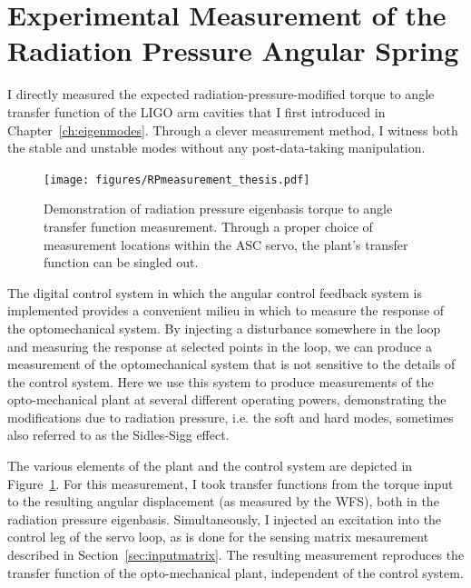 \section{Experimental Measurement of the Radiation Pressure Angular Spring}
\label{sec:siggsidles_measured}

I directly measured the expected radiation-pressure-modified torque to
angle transfer function of the LIGO arm cavities that I first
introduced in Chapter~\ref{ch:eigenmodes}. Through a clever
measurement method, I witness both the stable and unstable modes
without any post-data-taking manipulation.

\begin{figure}
\begin{centering}
\texttt{[image: figures/RPmeasurement\_thesis.pdf]}
\caption[Demonstration of radiation pressure eigenbasis torque to
angle transfer function measurement]{Demonstration of radiation
  pressure eigenbasis torque to angle transfer function
  measurement. Through a proper choice of measurement locations within
  the ASC servo, the plant's transfer function can be singled out.}
\label{fig:RPTFmeasurement}
\end{centering}
\end{figure}

The digital control system in which the angular control feedback
system is implemented provides a convenient milieu in which to measure
the response of the optomechanical system. By injecting a disturbance
somewhere in the loop and measuring the response at selected points in
the loop, we can produce a measurement of the optomechanical system
that is not sensitive to the details of the control system. Here we
use this system to produce measurements of the opto-mechanical plant at
several different operating powers, demonstrating the modifications due
to radiation pressure, i.e. the soft and hard modes, sometimes also
referred to as the Sidles-Sigg effect.

The various elements of the plant and the control system are depicted
in Figure~\ref{fig:RPTFmeasurement}.  For this measurement, I took
transfer functions from the torque input to the resulting angular
displacement (as measured by the WFS), both in the radiation pressure
eigenbasis. Simultaneously, I injected an excitation into the control
leg of the servo loop, as is done for the sensing matrix mesaurement
described in Section~\ref{sec:inputmatrix}. The resulting measurement
reproduces the transfer function of the opto-mechanical plant,
independent of the control system.

